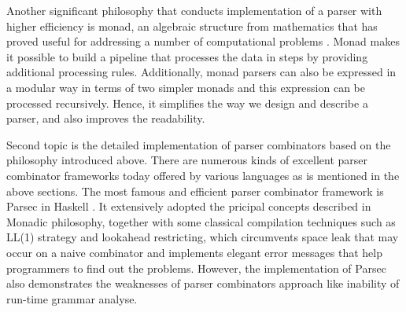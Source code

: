 Another significant philosophy that conducts implementation of a parser with higher efficiency is monad, an algebraic structure from mathematics that has proved useful for addressing a number of computational problems \cite{Hutton:1996}. Monad makes it possible to build a pipeline that processes the data in steps by providing additional processing rules. Additionally, monad parsers can also be expressed in a modular way in terms of two simpler monads and this expression can be processed recursively. Hence, it simplifies the way we design and describe a parser, and also improves the readability.

Second topic is the detailed implementation of parser combinators based on the philosophy introduced above. There are numerous kinds of excellent parser combinator frameworks today offered by various languages as is mentioned in the above sections. The most famous and efficient parser combinator framework is Parsec in Haskell \cite{Fokker:1995}. It extensively adopted the pricipal concepts described in Monadic philosophy, together with some classical compilation techniques such as LL(1) strategy and lookahead restricting, which circumvents space leak that may occur on a naive combinator and implements elegant error messages that help programmers to find out the problems. However, the implementation of Parsec also demonstrates the weaknesses of parser combinators approach like inability of run-time grammar analyse.

